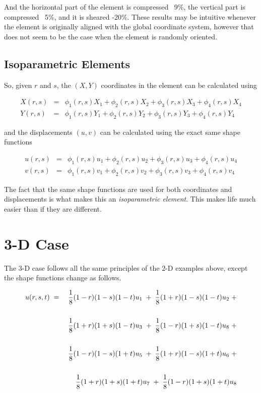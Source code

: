 And the horizontal part of the element is compressed ~9\%, the vertical part is compressed ~5\%, and it is sheared -20\%.  These results may be intuitive whenever the element is originally aligned with the global coordinate system, however that does not seem to be the case when the element is randomly oriented.

\subsection{Isoparametric Elements}
So, given $ r $ and $ s $, the $ (X,Y) $ coordinates in the element can be calculated using

\begin{eqnarray*}
X(r,s) & = & \phi_1(r,s) X_1 +  \phi_2(r,s) X_2 +  \phi_3(r,s) X_3 +  \phi_4(r,s) X_4
\\
Y(r,s) & = & \phi_1(r,s) Y_1 +  \phi_2(r,s) Y_2 +  \phi_3(r,s) Y_3 +  \phi_4(r,s) Y_4
\end{eqnarray*}

and the displacements $ (u,v) $ can be calculated using the exact same shape functions

\begin{eqnarray*}
u(r,s) & = & \phi_1(r,s) u_1 +  \phi_2(r,s) u_2 +  \phi_3(r,s) u_3 +  \phi_4(r,s) u_4
\\
v(r,s) & = & \phi_1(r,s) v_1 +  \phi_2(r,s) v_2 +  \phi_3(r,s) v_3 +  \phi_4(r,s) v_4
\end{eqnarray*}

The fact that the same shape functions are used for both coordinates and displacements is what makes this an \textit{isoparametric element}. This makes life much easier than if they are different.

\section{3-D Case}
The 3-D case follows all the same principles of the 2-D examples above, except the shape functions change as follows.

\begin{eqnarray*}
u(r,s,t) & \; = \; & {1\over 8}(1-r)(1-s)(1-t)u_1 \; + \; {1\over 8}(1+r)(1-s)(1-t)u_2 \; + \\
\\
         &   & {1\over 8}(1+r)(1+s)(1-t)u_3 \; + \; {1\over 8}(1-r)(1+s)(1-t)u_8 \; + \\
\\
	 &   & {1\over 8}(1-r)(1-s)(1+t)u_5 \; + \; {1\over 8}(1+r)(1-s)(1+t)u_6 \; + \\
\\
	 &   & {1\over 8}(1+r)(1+s)(1+t)u_7 \; + \; {1\over 8}(1-r)(1+s)(1+t)u_8
\end{eqnarray*}

